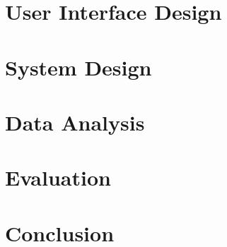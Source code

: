 \documentclass[12pt]{article}
\begin{document}
\section{User Interface Design}
\label{sec:design_ui}

\newpage

\section{System Design}
\label{sec:design_sys}

\newpage

\section{Data Analysis}
\label{sec:data}

\newpage

\section{Evaluation}
\label{sec:eval}

\newpage

\section{Conclusion}
\label{sec:concl}

\newpage

\begin{doublespace}
\printbibliography[heading=bibintoc,title={References}]
\end{doublespace}
\newpage

\appendix
\appendixpage
\addappheadtotoc

\newpage

\end{document}
